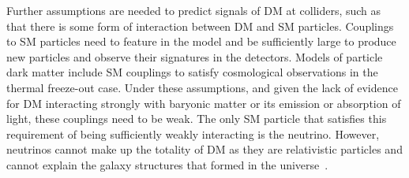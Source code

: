 


Further assumptions are needed to predict signals of DM at colliders, such
as that there is some form of interaction between DM and SM particles. 
Couplings to SM particles need to feature in the model and be sufficiently large
to produce new particles and observe their signatures in the detectors. 
Models of particle dark matter include SM couplings to satisfy
cosmological observations in the thermal freeze-out case. 
Under these assumptions, and given the lack of evidence for 
DM interacting strongly with baryonic matter or its emission or absorption of light,
these couplings need to be weak. 
The only SM particle that satisfies this requirement of being
sufficiently weakly interacting is the neutrino.
However, neutrinos cannot make up the totality of DM as they 
are relativistic particles and cannot explain the galaxy structures that formed in the universe~\cite{PlehnLecturesDM}. 



